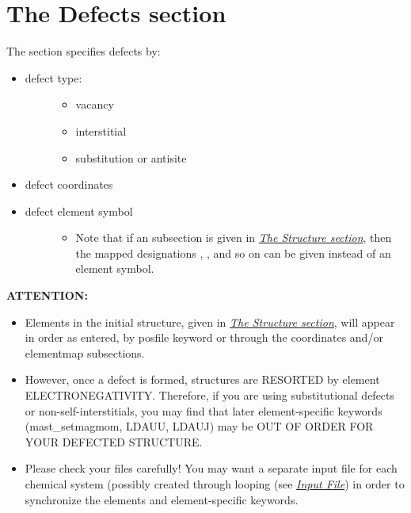 \documentclass[letterpaper,10pt,english]{sphinxmanual}
\begin{document}
\section{The Defects section}
\label{3_1_5_defects::doc}\label{3_1_5_defects:the-defects-section}
The  section specifies defects by:
\begin{itemize}
\item {} \begin{description}
\item[{defect type:}] \leavevmode\begin{itemize}
\item {} 
vacancy

\item {} 
interstitial

\item {} 
substitution or antisite

\end{itemize}

\end{description}

\item {} 
defect coordinates

\item {} \begin{description}
\item[{defect element symbol}] \leavevmode\begin{itemize}
\item {} 
Note that if an  subsection is given in {\hyperref[3_1_1_structure::doc]{\emph{The Structure section}}}, then the mapped designations , , and so on can be given instead of an element symbol.

\end{itemize}

\end{description}

\end{itemize}

\textbf{ATTENTION:}
\begin{itemize}
\item {} 
Elements in the initial structure, given in {\hyperref[3_1_1_structure::doc]{\emph{The Structure section}}}, will appear in order as entered, by posfile keyword or through the coordinates and/or elementmap subsections.

\item {} 
However, once a defect is formed, structures are RESORTED by element ELECTRONEGATIVITY.  Therefore, if you are using substitutional defects or non-self-interstitials, you may find that later element-specific keywords (mast\_setmagmom, LDAUU, LDAUJ) may be OUT OF ORDER FOR YOUR DEFECTED STRUCTURE.

\item {} 
Please check your files carefully! You may want a separate input file for each chemical system (possibly created through looping (see {\hyperref[3_0_inputfile::doc]{\emph{Input File}}}) in order to synchronize the elements and element-specific keywords.

\end{itemize}
\end{document}
